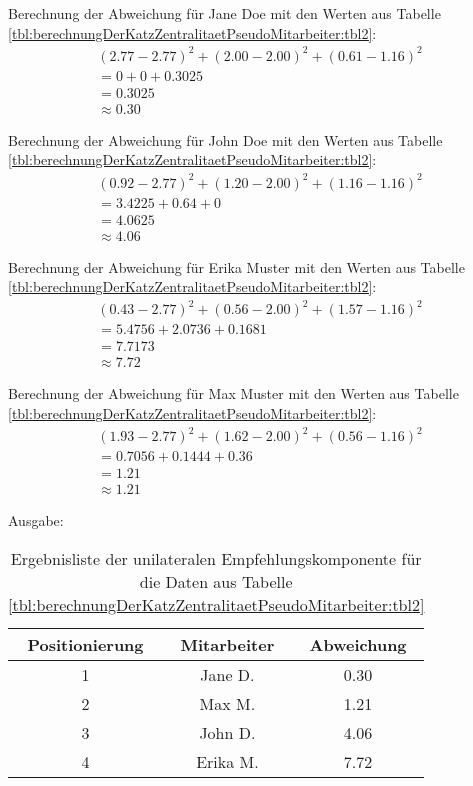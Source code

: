 Berechnung der Abweichung für Jane Doe mit den Werten aus Tabelle \ref{tbl:berechnungDerKatzZentralitaetPseudoMitarbeiter:tbl2}:
\begin{gather}
	\nonumber (2.77-2.77)^2 + (2.00-2.00)^2 + (0.61-1.16)^2\\
	\nonumber = 0 + 0 + 0.3025\\
	\nonumber = 0.3025\\
	\approx 0.30
	\label{frml:nebenrechnungen:unilateral:jane}
\end{gather}

Berechnung der Abweichung für John Doe mit den Werten aus Tabelle \ref{tbl:berechnungDerKatzZentralitaetPseudoMitarbeiter:tbl2}:
\begin{gather}
	\nonumber (0.92-2.77)^2 + (1.20-2.00)^2 + (1.16-1.16)^2\\
	\nonumber = 3.4225 + 0.64 + 0\\
	\nonumber = 4.0625\\
	\approx 4.06
	\label{frml:nebenrechnungen:unilateral:john}
\end{gather}

Berechnung der Abweichung für Erika Muster mit den Werten aus Tabelle \ref{tbl:berechnungDerKatzZentralitaetPseudoMitarbeiter:tbl2}:
\begin{gather}
	\nonumber (0.43-2.77)^2 + (0.56-2.00)^2 + (1.57-1.16)^2\\
	\nonumber = 5.4756 + 2.0736 + 0.1681\\
	\nonumber = 7.7173\\
	\approx 7.72
	\label{frml:nebenrechnungen:unilateral:erika}
\end{gather}

Berechnung der Abweichung für Max Muster mit den Werten aus Tabelle \ref{tbl:berechnungDerKatzZentralitaetPseudoMitarbeiter:tbl2}:
\begin{gather}
	\nonumber (1.93-2.77)^2 + (1.62-2.00)^2 + (0.56-1.16)^2\\
	\nonumber = 0.7056 + 0.1444 + 0.36\\
	\nonumber = 1.21\\
	\approx 1.21
	\label{frml:nebenrechnungen:unilateral:max}
\end{gather}

Ausgabe:
\begin{table}[h]
	\centering
	\begin{tabular}{c|c|c}
		Positionierung & Mitarbeiter & Abweichung\\
		\hline
		1 & Jane D.  & 0.30\\
		2 & Max M.   & 1.21\\
		3 & John D.  & 4.06\\
		4 & Erika M. & 7.72
	\end{tabular}
	\caption{Ergebnisliste der unilateralen Empfehlungskomponente für die Daten aus Tabelle \ref{tbl:berechnungDerKatzZentralitaetPseudoMitarbeiter:tbl2}}
	\label{tbl:nebenrechnungen:unilateral:ausgabe}
\end{table}